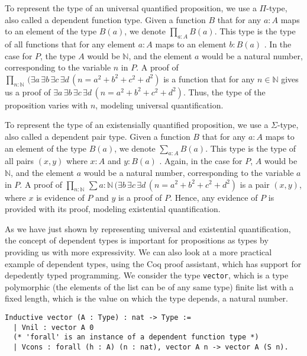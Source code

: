 To represent the type of an universal quantified proposition,
we use a $\Pi$-type, also called a dependent function type.
Given a function $B$ that for any $a : A$ maps to an
element of the type $B(a)$, we denote $\prod_{a : A} B(a)$.
This type is the type of all functions that for any element
$a : A$ maps to an element $b : B(a)$ \cite[p.~78] {lof1}.
In the case for $P$, the type $A$ would be $\mathbb{N}$,
and the element $a$ would be a natural number, corresponding to the variable $n$ in $P$.
A proof of $\prod_{n : \mathbb{N}} \, (\exists a \, \exists b \, \exists c \, \exists d \, (n = a^2 + b^2 + c^2 + d^2)$
is a function that for any $n \in \mathbb{N}$
gives us a proof of $\exists a \, \exists b \, \exists c \, \exists d \, (n = a^2 + b^2 + c^2 + d^2)$.
Thus, the type of the proposition varies with $n$,
modeling universal quantification.

To represent the type of an existensially quantified proposition,
we use a $\Sigma$-type, also called a dependent pair type.
Given a function $B$ that for any $a : A$ maps to an
element of the type $B(a)$, we denote $\sum_{a : A} B(a)$.
This type is the type of all pairs $(x, y)$ where
$x : A$ and $y : B(a)$ \cite[p.~79]{lof1}.
Again, in the case for $P$, $A$ would be $\mathbb{N}$,
and the element $a$ would be a natural number, corresponding to the variable $a$ in $P$.
A proof of $\prod_{n : \mathbb{N}} \, \sum{a : \mathbb{N}} \, (\exists b \, \exists c \, \exists d \, (n = a^2 + b^2 + c^2 + d^2)$
is a pair $(x, y)$, where $x$ is evidence of $P$
and $y$ is a proof of $P$.
Hence, any evidence of $P$ is provided with its proof,
modeling existential quantification.

As we have just shown by representing universal and existential quantification,
the concept of dependent types is important for propositions as types
by providing us with more expressivity.
We can also look at a more practical example of dependent types,
using the Coq proof assistant, which has support for depedently typed programming.
We consider the type \lstinline{vector}, which is a type polymorphic (the elements of the list can be of any same type)
finite list with a fixed length, which is the value on which the type depends, a natural number.

\begin{minipage}{\linewidth}
\begin{lstlisting}[language=Coq, label={lst:dep_type_vec}, caption={\lstinline{vector} in Coq, using dependent types}]
Inductive vector (A : Type) : nat -> Type :=
  | Vnil : vector A 0
  (* 'forall' is an instance of a dependent function type *)
  | Vcons : forall (h : A) (n : nat), vector A n -> vector A (S n).
\end{lstlisting}
\end{minipage}

